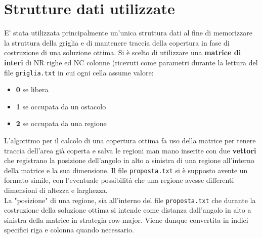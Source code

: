 \documentclass[11pt, a4paper, titlepage]{article}
\begin{document}
    \section{Strutture dati utilizzate}
        E' stata utilizzata principalmente un'unica struttura dati al fine di memorizzare la struttura della griglia e di
        mantenere traccia della copertura in fase di costruzione di una soluzione ottima. Si è scelto di utilizzare una \textbf{matrice di interi}
        di NR righe ed NC colonne (ricevuti come parametri durante la lettura del file \texttt{griglia.txt} in cui ogni cella assume valore:
        \begin{itemize}
            \item \textbf{0} se libera
            \item \textbf{1} se occupata da un ostacolo
            \item \textbf{2} se occupata da una regione\\
        \end{itemize}

        L'algoritmo per il calcolo di una copertura ottima fa uso della matrice per tenere traccia dell'area già coperta
        e salva le regioni man mano inserite con due \textbf{vettori} che registrano la posizione dell'angolo in alto a sinistra di una regione
        all'interno della matrice e la sua dimensione. Il file \texttt{proposta.txt} si è supposto avente un formato simile, con l'eventuale
        possibilità che una regione avesse differenti dimensioni di altezza e larghezza.\\

        La "posizione" di una regione, sia all'interno del file \texttt{proposta.txt} che durante la costruzione della soluzione ottima si intende come distanza
        dall'angolo in alto a sinistra della matrice in strategia row-major. Viene dunque convertita in indici specifici riga e colonna quando necessario.
\end{document}
